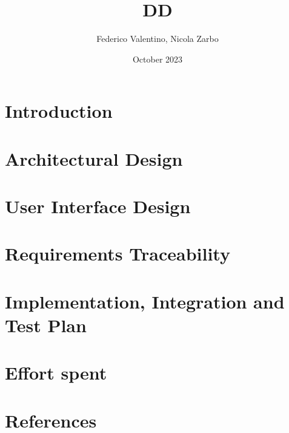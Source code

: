 \documentclass[twoside]{book}
\begin{document}
\title{DD}
\author{Federico Valentino, Nicola Zarbo }
\date{October 2023}


\maketitle
\newpage
\setcounter{page}{1}

\tableofcontents %
\cleardoublepage

\chapter{Introduction}

\newpage

\chapter{Architectural Design}

\newpage

\chapter{User Interface Design}

\newpage

\chapter{Requirements Traceability}

\newpage

\chapter{Implementation, Integration and Test Plan}

\newpage

\chapter{Effort spent}

\newpage

\chapter{References}

\end{document}
